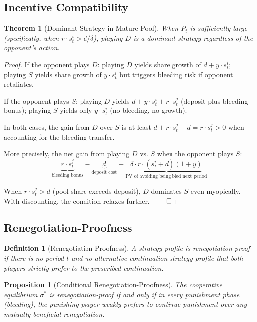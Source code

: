 \documentclass[12pt]{article}
\newtheorem{definition}{Definition}
\newtheorem{theorem}{Theorem}
\newtheorem{proposition}{Proposition}
\begin{document}
\subsection{Incentive Compatibility}

\begin{theorem}[Dominant Strategy in Mature Pool]
\label{thm:ic}
When $P_t$ is sufficiently large (specifically, when $r \cdot s_t^i > d / \delta$), playing $D$ is a dominant strategy regardless of the opponent's action.
\end{theorem}

\begin{proof}
If the opponent plays $D$: playing $D$ yields share growth of $d + y \cdot s_t^i$; playing $S$ yields share growth of $y \cdot s_t^i$ but triggers bleeding risk if opponent retaliates.

If the opponent plays $S$: playing $D$ yields $d + y \cdot s_t^i + r \cdot s_t^j$ (deposit plus bleeding bonus); playing $S$ yields only $y \cdot s_t^i$ (no bleeding, no growth).

In both cases, the gain from $D$ over $S$ is at least $d + r \cdot s_t^j - d = r \cdot s_t^j > 0$ when accounting for the bleeding transfer.

More precisely, the net gain from playing $D$ vs. $S$ when the opponent plays $S$:
\[
\underbrace{r \cdot s_t^j}_{\text{bleeding bonus}} - \underbrace{d}_{\text{deposit cost}} + \underbrace{\delta \cdot r \cdot (s_t^i + d)(1+y)}_{\text{PV of avoiding being bled next period}}
\]

When $r \cdot s_t^j > d$ (pool share exceeds deposit), $D$ dominates $S$ even myopically. With discounting, the condition relaxes further. $\qed$
\end{proof}

\subsection{Renegotiation-Proofness}
\label{sec:reneg}

\begin{definition}[Renegotiation-Proofness]
A strategy profile is \textit{renegotiation-proof} if there is no period $t$ and no alternative continuation strategy profile that both players strictly prefer to the prescribed continuation.
\end{definition}

\begin{proposition}[Conditional Renegotiation-Proofness]
\label{prop:reneg}
The cooperative equilibrium $\sigma^*$ is renegotiation-proof if and only if in every punishment phase (bleeding), the punishing player weakly prefers to continue punishment over any mutually beneficial renegotiation.
\end{proposition}
\end{document}
